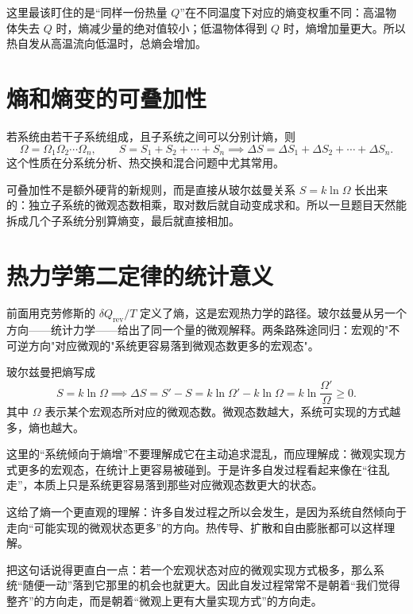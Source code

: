 \documentclass[lang=cn,11pt]{elegantbook}
\newcommand{\bridge}[1]{\begin{note}#1\end{note}}
\begin{document}
\begin{note}
这里最该盯住的是“同样一份热量 \(Q\)”在不同温度下对应的熵变权重不同：高温物体失去 \(Q\) 时，熵减少量的绝对值较小；低温物体得到 \(Q\) 时，熵增加量更大。所以热自发从高温流向低温时，总熵会增加。
\end{note}

\section{熵和熵变的可叠加性}

若系统由若干子系统组成，且子系统之间可以分别计熵，则
\[
\Omega=\Omega_1\Omega_2\cdots\Omega_n,\qquad
S=S_1+S_2+\cdots+S_n
\implies
\Delta S=\Delta S_1+\Delta S_2+\cdots+\Delta S_n.
\]
这个性质在分系统分析、热交换和混合问题中尤其常用。

\begin{note}
可叠加性不是额外硬背的新规则，而是直接从玻尔兹曼关系 \(S=k\ln\Omega\) 长出来的：独立子系统的微观态数相乘，取对数后就自动变成求和。所以一旦题目天然能拆成几个子系统分别算熵变，最后就直接相加。
\end{note}

\section{热力学第二定律的统计意义}

\bridge{前面用克劳修斯的 \(\delta Q_{\mathrm{rev}}/T\) 定义了熵，这是宏观热力学的路径。玻尔兹曼从另一个方向——统计力学——给出了同一个量的微观解释。两条路殊途同归：宏观的"不可逆方向"对应微观的"系统更容易落到微观态数更多的宏观态"。}

玻尔兹曼把熵写成
\[
S=k\ln\Omega
\implies
\Delta S=S'-S=k\ln\Omega'-k\ln\Omega
=k\ln\frac{\Omega'}{\Omega}\ge 0.
\]
其中 \(\Omega\) 表示某个宏观态所对应的微观态数。微观态数越大，系统可实现的方式越多，熵也越大。

\begin{note}
这里的“系统倾向于熵增”不要理解成它在主动追求混乱，而应理解成：微观实现方式更多的宏观态，在统计上更容易被碰到。于是许多自发过程看起来像在“往乱走”，本质上只是系统更容易落到那些对应微观态数更大的状态。
\end{note}

\begin{remark}
这给了熵一个更直观的理解：许多自发过程之所以会发生，是因为系统自然倾向于走向“可能实现的微观状态更多”的方向。热传导、扩散和自由膨胀都可以这样理解。
\end{remark}

把这句话说得更直白一点：若一个宏观状态对应的微观实现方式极多，那么系统“随便一动”落到它那里的机会也就更大。因此自发过程常常不是朝着“我们觉得整齐”的方向走，而是朝着“微观上更有大量实现方式”的方向走。
\end{document}
